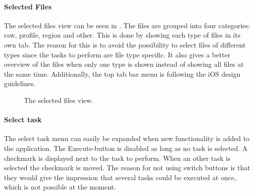 \paragraph{Selected Files}
The selected files view can be seen in . The files are grouped into four categories: raw, profile, region and other. This is done by showing each type of files in its own tab. The reason for this is to avoid the possibility to select files of different types since the tasks to perform are file type specific. It also gives a better overview of the files when only one type is shown instead of showing all files at the same time. Additionally, the top tab bar menu is following the iOS design guidelines.

\begin{figure}[ht]
\caption{The selected files view.}
\label{fig:ios_selectedFiles2}
\end{figure}
\FloatBarrier

\paragraph{Select task}
The select task menu can easily be expanded when new functionality is added to the application. The Execute-button is disabled as long as no task is selected. A checkmark is displayed next to the task to perform. When an other task is selected the checkmark is moved. The reason for not using switch buttons is that they would give the impression that several tasks could be executed at once, which is not possible at the moment.